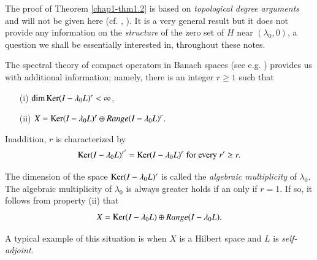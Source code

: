 The proof of Theorem \ref{chap1-thm1.2} is based on {\em topological degree arguments} and will not be given here (cf. \cite{19}, \cite{27}). It is a very general result but it does not provide any information on the {\em structure} of the zero set of $H$ near $(\lambda_{0}, 0)$, a question we shall be essentially interested in, throughout these notes.

The spectral theory of compact operators in Banach spaces (see e.g. \cite{9}) provides us with additional information; namely, there is an integer $r \geq 1$ such that
\begin{enumerate}
\item[(i)] $\dim \operatorname{Ker} (I - \lambda_{0} L)^{r} < \infty$,

\item[(ii)] $X = \operatorname{Ker}(I - \lambda_{0} L)^{r} \oplus Range (I - \lambda_{0} L)^{r}$.
\end{enumerate}

In\pageoriginale addition, $r$ is characterized by
$$
\operatorname{Ker} (I - \lambda_{0} L)^{r'} = \operatorname{Ker}(I - \lambda_{0} L)^{r} \text{ for every } r' \geq r.
$$

The dimension of the space $\operatorname{Ker} (I - \lambda_{0}L)^{r}$ is called the {\em algebraic multiplicity} of $\lambda_{0}$. The algebraic multiplicity of $\lambda_{0}$ is always greater holds if an only if $r = 1$. If so, it follows from property (ii) that
$$
X = \operatorname{Ker}(I - \lambda_{0}L) \oplus Range (I - \lambda_{0}L).
$$

A typical example of this situation is when $X$ is a Hilbert space and $L$ is {\em self-adjoint}.

